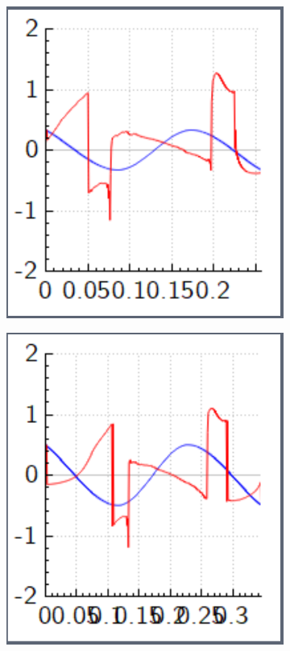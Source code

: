\documentclass[aps,pra,reprint,superscriptaddress]{revtex4-1}
\begin{document}
\begin{figure}
	\begin{subfigure}{0.4\columnwidth}
		\includegraphics[width=\columnwidth]{graphics/similar_solutions/T02563k3A033.PNG}
	\end{subfigure}
	\begin{subfigure}{0.4\columnwidth}
		\includegraphics[width=\columnwidth]{graphics/similar_solutions/T03450k3A050.PNG}

\end{subfigure}
\end{figure}
\end{document}
